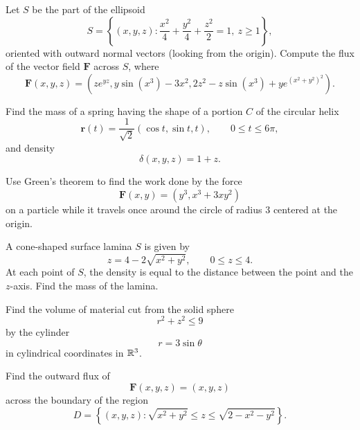 \begin{problem}
Let $S$ be the part of the ellipsoid
\[
S=
\left\{(x,y,z):
\frac{x^2}{4}+\frac{y^2}{4}+\frac{z^2}{2}=1,
\ z\ge1
\right\},
\]
oriented with outward normal vectors (looking from the origin). Compute the flux of the vector field $\mathbf F$ across $S$, where
\[
\mathbf F(x,y,z)
=
\left(
ze^{yz},
 y\sin(x^3)-3x^2,
 2z^2-z\sin(x^3)+ye^{(x^2+y^2)^2}
\right).
\]
\end{problem}

\begin{problem}
Find the mass of a spring having the shape of a portion $C$ of the circular helix
\[
\mathbf r(t)=\frac{1}{\sqrt2}(\cos t,\sin t,t),
\qquad
0\le t\le6\pi,
\]
and density
\[
\delta(x,y,z)=1+z.
\]
\end{problem}

\begin{problem}
Use Green's theorem to find the work done by the force
\[
\mathbf F(x,y)=(y^3,x^3+3xy^2)
\]
on a particle while it travels once around the circle of radius $3$ centered at the origin.
\end{problem}

\begin{problem}
A cone-shaped surface lamina $S$ is given by
\[
z=4-2\sqrt{x^2+y^2},
\qquad
0\le z\le4.
\]
At each point of $S$, the density is equal to the distance between the point and the $z$-axis. Find the mass of the lamina.
\end{problem}

\begin{problem}
Find the volume of material cut from the solid sphere
\[
r^2+z^2\le9
\]
by the cylinder
\[
r=3\sin\theta
\]
in cylindrical coordinates in $\mathbb{R}^3$.
\end{problem}

\begin{problem}
Find the outward flux of
\[
\mathbf F(x,y,z)=(x,y,z)
\]
across the boundary of the region
\[
D=
\left\{(x,y,z):
\sqrt{x^2+y^2}\le z\le\sqrt{2-x^2-y^2}
\right\}.
\]
\end{problem}


